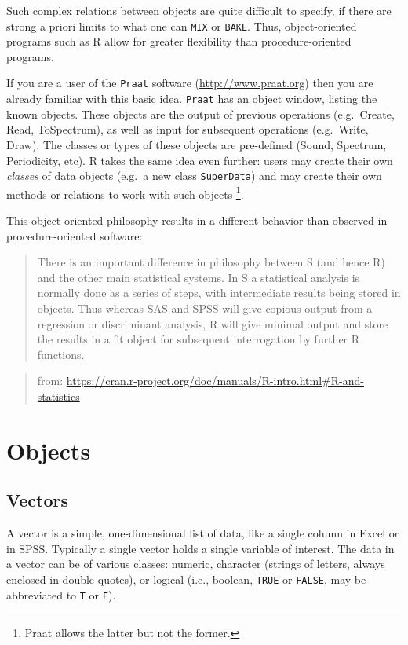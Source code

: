 \documentclass[]{book}
\begin{document}
Such complex relations between objects are quite difficult to specify,
if there are strong a priori limits to what one can \texttt{MIX} or \texttt{BAKE}.
Thus, object-oriented programs such as R allow for
greater flexibility than procedure-oriented programs.

If you are a user of the \texttt{Praat} software (\url{http://www.praat.org}) then you are already familiar with this basic idea.
\texttt{Praat} has an object window, listing the known objects.
These objects are the output of previous operations (e.g.~Create, Read,
ToSpectrum), as well as input for subsequent operations (e.g.~Write,
Draw). The classes or types of these objects are pre-defined (Sound,
Spectrum, Periodicity, etc). R takes the same idea even
further: users may create their own \emph{classes} of data objects (e.g.~a new
class \texttt{SuperData}) and may create their own methods or relations to work with
such objects \footnote{Praat allows the latter but not the former.}.

This object-oriented philosophy results in a different behavior than
observed in procedure-oriented software:

\begin{quote}
There is an important difference in philosophy between S (and hence R)
and the other main statistical systems. In S a statistical analysis is
normally done as a series of steps, with intermediate results being
stored in objects. Thus whereas SAS and SPSS will give copious output
from a regression or discriminant analysis, R will give minimal output
and store the results in a fit object for subsequent interrogation by
further R functions.
\end{quote}

\begin{quote}
from: \url{https://cran.r-project.org/doc/manuals/R-intro.html\#R-and-statistics}
\end{quote}

\hypertarget{ch:objects}{%
\chapter{Objects}\label{ch:objects}}

\hypertarget{sec:vectors}{%
\section{Vectors}\label{sec:vectors}}

A vector is a simple, one-dimensional list of data, like a single column
in Excel or in SPSS. Typically a single vector holds a single variable
of interest. The data in a vector can be of various classes: numeric,
character (strings of letters, always enclosed in double quotes), or
logical (i.e., boolean, \texttt{TRUE} or
\texttt{FALSE}, may be abbreviated to
\texttt{T} or \texttt{F}).
\end{document}
